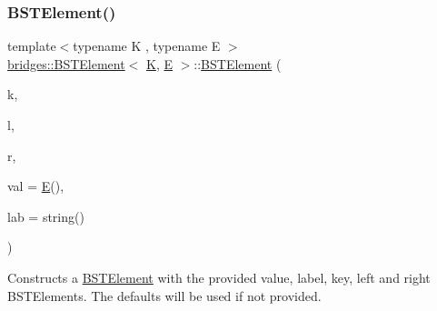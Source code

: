 \subsubsection{\texorpdfstring{BSTElement()}{BSTElement()}\hspace{0.1cm}{\footnotesize\ttfamily [1/2]}}
{\footnotesize\ttfamily template$<$typename K , typename E $>$ \\
\mbox{\hyperlink{classbridges_1_1_b_s_t_element}{bridges\+::\+B\+S\+T\+Element}}$<$ \mbox{\hyperlink{namespacebridges_acfb0a4f7877d8f63de3e6862004c50edaa5f3c6a11b03839d46af9fb43c97c188}{K}}, \mbox{\hyperlink{namespacebridges_acfb0a4f7877d8f63de3e6862004c50eda3a3ea00cfc35332cedf6e5e9a32e94da}{E}} $>$\+::\mbox{\hyperlink{classbridges_1_1_b_s_t_element}{B\+S\+T\+Element}} (\begin{DoxyParamCaption}\item[{const \mbox{\hyperlink{namespacebridges_acfb0a4f7877d8f63de3e6862004c50edaa5f3c6a11b03839d46af9fb43c97c188}{K}} \&}]{k,  }\item[{\mbox{\hyperlink{classbridges_1_1_b_s_t_element}{B\+S\+T\+Element}}$<$ \mbox{\hyperlink{namespacebridges_acfb0a4f7877d8f63de3e6862004c50edaa5f3c6a11b03839d46af9fb43c97c188}{K}}, \mbox{\hyperlink{namespacebridges_acfb0a4f7877d8f63de3e6862004c50eda3a3ea00cfc35332cedf6e5e9a32e94da}{E}} $>$ $\ast$}]{l,  }\item[{\mbox{\hyperlink{classbridges_1_1_b_s_t_element}{B\+S\+T\+Element}}$<$ \mbox{\hyperlink{namespacebridges_acfb0a4f7877d8f63de3e6862004c50edaa5f3c6a11b03839d46af9fb43c97c188}{K}}, \mbox{\hyperlink{namespacebridges_acfb0a4f7877d8f63de3e6862004c50eda3a3ea00cfc35332cedf6e5e9a32e94da}{E}} $>$ $\ast$}]{r,  }\item[{const \mbox{\hyperlink{namespacebridges_acfb0a4f7877d8f63de3e6862004c50eda3a3ea00cfc35332cedf6e5e9a32e94da}{E}} \&}]{val = {\ttfamily \mbox{\hyperlink{namespacebridges_acfb0a4f7877d8f63de3e6862004c50eda3a3ea00cfc35332cedf6e5e9a32e94da}{E}}()},  }\item[{const string \&}]{lab = {\ttfamily string()} }\end{DoxyParamCaption})\hspace{0.3cm}{\ttfamily [inline]}}

Constructs a \mbox{\hyperlink{classbridges_1_1_b_s_t_element}{B\+S\+T\+Element}} with the provided value, label, key, left and right B\+S\+T\+Elements. The defaults will be used if not provided.


